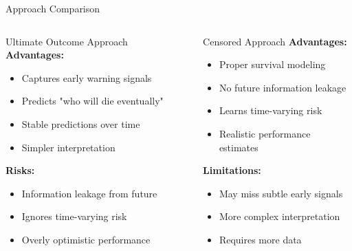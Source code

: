 \documentclass{beamer}
\begin{document}
\begin{frame}{Approach Comparison}
\begin{columns}[T]
\begin{block}{Ultimate Outcome Approach}
\small
\textbf{Advantages:}
\begin{itemize}
    \item Captures early warning signals
    \item Predicts "who will die eventually"
    \item Stable predictions over time
    \item Simpler interpretation
\end{itemize}

\vspace{0.2cm}
\textbf{Risks:}
\begin{itemize}
    \item Information leakage from future
    \item Ignores time-varying risk
    \item Overly optimistic performance
\end{itemize}
\end{block}

\begin{block}{Censored Approach}
\small
\textbf{Advantages:}
\begin{itemize}
    \item Proper survival modeling
    \item No future information leakage
    \item Learns time-varying risk
    \item Realistic performance estimates
\end{itemize}

\vspace{0.2cm}
\textbf{Limitations:}
\begin{itemize}
    \item May miss subtle early signals
    \item More complex interpretation
    \item Requires more data
\end{itemize}
\end{block}
\end{columns}
\end{frame}
\end{document}
